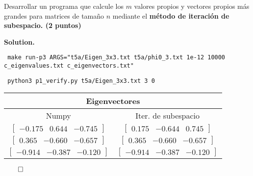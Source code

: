 \documentclass{article}
\theoremstyle{problemstyle}
\newenvironment{solution}{%
  \begin{mdframed}[linewidth=0.8pt,linecolor=Gray,backgroundcolor=Gray!5,roundcorner=5pt]%
  \noindent\textbf{Solution.}%
}{%
\hfill $ \qed $ 
  \end{mdframed}%
}
\begin{document}
\begin{problem}
Desarrollar un programa que calcule los $ m $ valores propios y vectores
propios más grandes para matrices de tama\~no $ n $ mediante el
\textbf{m\'etodo de iteraci\'on de subespacio. (2 puntos)}
\end{problem}
\begin{solution}

	\begin{center}
		\texttt{
			make run-p3 ARGS="t5a/Eigen\_3x3.txt t5a/phi0\_3.txt 1e-12
			10000 c\_eigenvalues.txt c\_eigenvectors.txt"
		}
	\end{center}
	\begin{center}
		\texttt{    python3 p1\_verify.py t5a/Eigen\_3x3.txt 3 0}
	\end{center}
	\begin{table}[H]
		\begin{center}
			\begin{tabular}{|c|c|}
				\multicolumn{2}{c}{Eigenvectores}               \\
				\hline
				Numpy                     & Iter. de subespacio \\
				\hline
				\rule{0pt}{1.5em}
				$ \begin{bmatrix}
						  -0.175 & 0.644 & -0.745
					  \end{bmatrix} $  &
				$ \begin{bmatrix}
						  0.175 & -0.644 & 0.745
					  \end{bmatrix} $                        \\
				[0.5em]
				\hline
				\rule{0pt}{1.5em}
				$ \begin{bmatrix}
						  0.365 & -0.660 & -0.657
					  \end{bmatrix} $  & $ \begin{bmatrix}
						                       0.365 & -0.660 & -0.657
					                       \end{bmatrix} $  \\
				[0.5em]
				\hline
				\rule{0pt}{1.5em}
				$ \begin{bmatrix}
						  -0.914 & -0.387 & -0.120
					  \end{bmatrix} $ & $ \begin{bmatrix}
						                      -0.914 & -0.387 & -0.120
					                      \end{bmatrix} $  \\
				[0.5em]
				\hline
			\end{tabular}


\end{center}
\end{table}
\end{solution}
\end{document}

